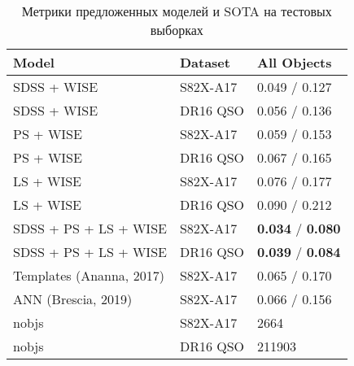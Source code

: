 \begin{table*}
    \centering
    \begin{tabular}{lll}
    \hline
                        Model &   Dataset &                      All Objects \\
    \hline
                  SDSS + WISE &  S82X-A17 &                    0.049 / 0.127 \\
                  SDSS + WISE &  DR16 QSO &                    0.056 / 0.136 \\
                    PS + WISE &  S82X-A17 &                    0.059 / 0.153 \\
                    PS + WISE &  DR16 QSO &                    0.067 / 0.165 \\
                    LS + WISE &  S82X-A17 &                    0.076 / 0.177 \\
                    LS + WISE &  DR16 QSO &                    0.090 / 0.212 \\
        SDSS + PS + LS + WISE &  S82X-A17 &  \textbf{0.034} / \textbf{0.080} \\
        SDSS + PS + LS + WISE &  DR16 QSO &  \textbf{0.039} / \textbf{0.084} \\
     Templates (Ananna, 2017) &  S82X-A17 &                    0.065 / 0.170 \\
          ANN (Brescia, 2019) &  S82X-A17 &                    0.066 / 0.156 \\
                        nobjs &  S82X-A17 &                             2664 \\
                        nobjs &  DR16 QSO &                           211903 \\
    \hline
    \end{tabular}
    
    \caption{Метрики предложенных моделей и SOTA на тестовых выборках}
    \label{tab:metrics-rmag}
\end{table*}



